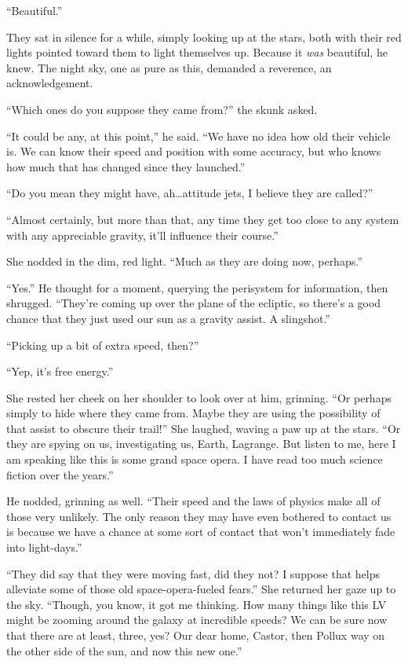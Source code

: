 ``Beautiful.''

They sat in silence for a while, simply looking up at the stars, both with their red lights pointed toward them to light themselves up. Because it \emph{was} beautiful, he knew. The night sky, one as pure as this, demanded a reverence, an acknowledgement.

``Which ones do you suppose they came from?'' the skunk asked.

``It could be any, at this point,'' he said. ``We have no idea how old their vehicle is. We can know their speed and position with some accuracy, but who knows how much that has changed since they launched.''

``Do you mean they might have, ah\ldots attitude jets, I believe they are called?''

``Almost certainly, but more than that, any time they get too close to any system with any appreciable gravity, it'll influence their course.''

She nodded in the dim, red light. ``Much as they are doing now, perhaps.''

``Yes.'' He thought for a moment, querying the perisystem for information, then shrugged. ``They're coming up over the plane of the ecliptic, so there's a good chance that they just used our sun as a gravity assist. A slingshot.''

``Picking up a bit of extra speed, then?''

``Yep, it's free energy.''

She rested her cheek on her shoulder to look over at him, grinning. ``Or perhaps simply to hide where they came from. Maybe they are using the possibility of that assist to obscure their trail!'' She laughed, waving a paw up at the stars. ``Or they are spying on us, investigating us, Earth, Lagrange. But listen to me, here I am speaking like this is some grand space opera. I have read too much science fiction over the years.''

He nodded, grinning as well. ``Their speed and the laws of physics make all of those very unlikely. The only reason they may have even bothered to contact us is because we have a chance at some sort of contact that won't immediately fade into light-days.''

``They did say that they were moving fast, did they not? I suppose that helps alleviate some of those old space-opera-fueled fears.'' She returned her gaze up to the sky. ``Though, you know, it got me thinking. How many things like this LV might be zooming around the galaxy at incredible speeds? We can be sure now that there are at least, three, yes? Our dear home, Castor, then Pollux way on the other side of the sun, and now this new one.''

